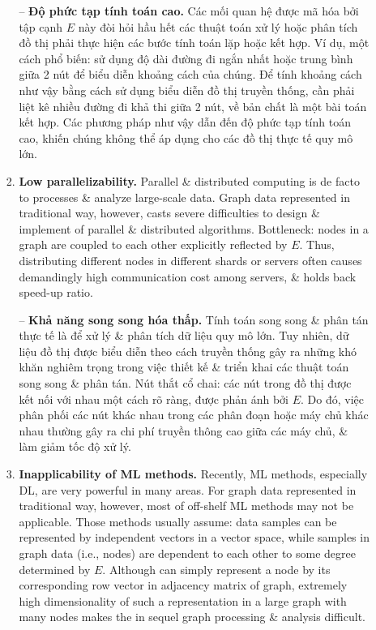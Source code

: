 \documentclass{article}
\begin{document}
\begin{itemize}
\begin{itemize}
\begin{enumerate}
            -- {\bf Độ phức tạp tính toán cao.} Các mối quan hệ được mã hóa bởi tập cạnh $E$ này đòi hỏi hầu hết các thuật toán xử lý hoặc phân tích đồ thị phải thực hiện các bước tính toán lặp hoặc kết hợp. Ví dụ, một cách phổ biến: sử dụng độ dài đường đi ngắn nhất hoặc trung bình giữa 2 nút để biểu diễn khoảng cách của chúng. Để tính khoảng cách như vậy bằng cách sử dụng biểu diễn đồ thị truyền thống, cần phải liệt kê nhiều đường đi khả thi giữa 2 nút, về bản chất là một bài toán kết hợp. Các phương pháp như vậy dẫn đến độ phức tạp tính toán cao, khiến chúng không thể áp dụng cho các đồ thị thực tế quy mô lớn.
            \item {\bf Low parallelizability.} Parallel \& distributed computing is de facto to processes \& analyze large-scale data. Graph data represented in traditional way, however, casts severe difficulties to design \& implement of parallel \& distributed algorithms. Bottleneck: nodes in a graph are coupled to each other explicitly reflected by $E$. Thus, distributing different nodes in different shards or servers often causes demandingly high communication cost among servers, \& holds back speed-up ratio.

            -- {\bf Khả năng song song hóa thấp.} Tính toán song song \& phân tán thực tế là để xử lý \& phân tích dữ liệu quy mô lớn. Tuy nhiên, dữ liệu đồ thị được biểu diễn theo cách truyền thống gây ra những khó khăn nghiêm trọng trong việc thiết kế \& triển khai các thuật toán song song \& phân tán. Nút thắt cổ chai: các nút trong đồ thị được kết nối với nhau một cách rõ ràng, được phản ánh bởi $E$. Do đó, việc phân phối các nút khác nhau trong các phân đoạn hoặc máy chủ khác nhau thường gây ra chi phí truyền thông cao giữa các máy chủ, \& làm giảm tốc độ xử lý.
            \item {\bf Inapplicability of ML methods.} Recently, ML methods, especially DL, are very powerful in many areas. For graph data represented in traditional way, however, most of off-shelf ML methods may not be applicable. Those methods usually assume: data samples can be represented by independent vectors in a vector space, while samples in graph data (i.e., nodes) are dependent to each other to some degree determined by $E$. Although can simply represent a node by its corresponding row vector in adjacency matrix of graph, extremely high dimensionality of such a representation in a large graph with many nodes makes the in sequel graph processing \& analysis difficult.


\end{enumerate}
\end{itemize}
\end{itemize}
\end{document}
